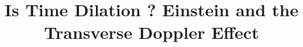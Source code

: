 \documentclass[pdflatex]{sn-jnl} %
\title{Is Time Dilation \s{Real}? Einstein and the Transverse Doppler Effect}
\providecommand{\DIFaddbegin}{} %
\providecommand{\DIFdelbegin}{} %
\providecommand{\DIFdelend}{} %
\begin{document}
\DIFdelbegin %
\DIFdelend %

 \DIFaddbegin 
\end{document}
